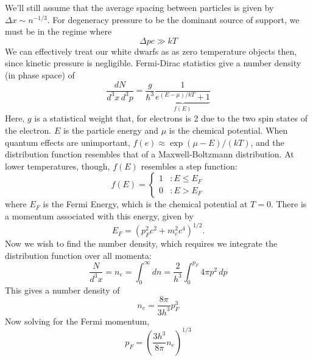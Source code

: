 \documentclass[10pt]{article}
\numberwithin{equation}{section}
\newcommand{\n}{\noindent}
\begin{document}
		\n We'll still assume that the average spacing between particles is given by $\Delta x \sim n^{-1/3}$. For degeneracy pressure to be the dominant source of support, we must be in the regime where
		\begin{equation}
			\label{eq:wd_struc:16a} \Delta p c \gg kT
		\end{equation}
		We can effectively treat our white dwarfs as as zero temperature objects then, since kinetic pressure is negligible. Fermi-Dirac statistics give a number density (in phase space) of
		\begin{equation}
			\label{eq:wd_struc:17} \frac{dN}{d^3x\,d^3p} = \frac{g}{\hbar^3}\underbrace{\frac{1}{e^{(E-\mu)/kT}+1}}_{f(E)}
		\end{equation}
		Here, $g$ is a statistical weight that, for electrons is 2 due to the two spin states of the electron. $E$ is the particle energy and $\mu$ is the chemical potential. When quantum effects are unimportant, $f(e)\approx \exp{(\mu-E)/(kT)}$, and the distribution function resembles that of a Maxwell-Boltzmann distribution. At lower temperatures, though, $f(E)$ resembles a step function:
		\begin{equation}
			\label{eq:wd_struc:18} f(E) = \left\{ \begin{array}{ll}
				1 & :E \leq E_{F}\\
				0 & :E > E_F
			\end{array}\right.
		\end{equation}
		where $E_F$ is the Fermi Energy, which is the chemical potential at $T=0$. There is a momentum associated with this energy, given by 
		\begin{equation}
			\label{eq:wd_struc:19} E_F = \left(p_F^2 c^2 + m_e^2c^4\right)^{1/2}.
		\end{equation}
		Now we wish to find the number density, which requires we integrate the distribution function over all momenta:
		\begin{equation}
			\label{eq:wd_struc:20} \frac{N}{d^3x} = n_e = \int_0^\infty dn = \frac{2}{h^3}\int_0^{p_F} 4\pi p^2\,dp
		\end{equation}
		This gives a number density of
		\begin{equation}
			\label{eq:wd_struc:21} n_e = \frac{8\pi}{3h^3}p_F^3
		\end{equation}
		Now solving for the Fermi momentum,
		\begin{equation}
			\label{eq:wd_struc:22} p_F = \left(\frac{3h^3}{8\pi}n_e\right)^{1/3}
		\end{equation}
\end{document}
